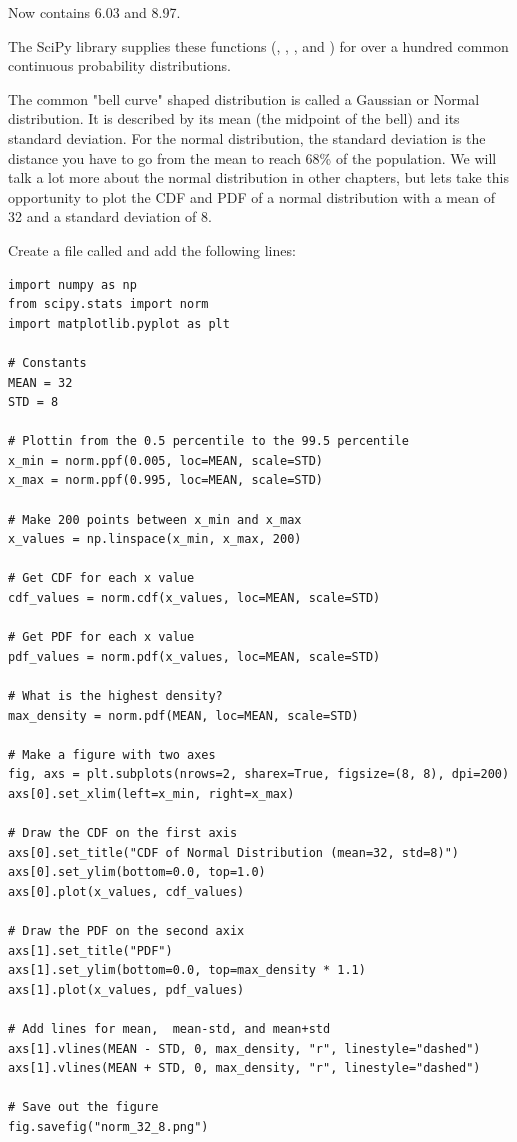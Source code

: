 Now  contains 6.03 and 8.97.

The SciPy library supplies these functions (, ,  , and ) for over a hundred 
common continuous probability distributions.   

The common "bell curve" shaped distribution is called a Gaussian  or Normal distribution.  It is described by its mean (the midpoint of the bell) and its standard deviation.   For the normal distribution,  the standard deviation is the distance you have to go from the mean to reach 68\% of the population. 
We will talk a lot more about the normal distribution in other chapters,  but lets take this opportunity to plot the CDF and PDF of a normal distribution with a mean of 32 and a standard deviation of 8.

Create a file called  and add the following lines:

\begin{verbatim}
import numpy as np
from scipy.stats import norm
import matplotlib.pyplot as plt

# Constants
MEAN = 32
STD = 8

# Plottin from the 0.5 percentile to the 99.5 percentile
x_min = norm.ppf(0.005, loc=MEAN, scale=STD)
x_max = norm.ppf(0.995, loc=MEAN, scale=STD)

# Make 200 points between x_min and x_max
x_values = np.linspace(x_min, x_max, 200)

# Get CDF for each x value
cdf_values = norm.cdf(x_values, loc=MEAN, scale=STD)

# Get PDF for each x value
pdf_values = norm.pdf(x_values, loc=MEAN, scale=STD)

# What is the highest density?
max_density = norm.pdf(MEAN, loc=MEAN, scale=STD)

# Make a figure with two axes
fig, axs = plt.subplots(nrows=2, sharex=True, figsize=(8, 8), dpi=200)
axs[0].set_xlim(left=x_min, right=x_max)

# Draw the CDF on the first axis
axs[0].set_title("CDF of Normal Distribution (mean=32, std=8)")
axs[0].set_ylim(bottom=0.0, top=1.0)
axs[0].plot(x_values, cdf_values)

# Draw the PDF on the second axix
axs[1].set_title("PDF")
axs[1].set_ylim(bottom=0.0, top=max_density * 1.1)
axs[1].plot(x_values, pdf_values)

# Add lines for mean,  mean-std, and mean+std
axs[1].vlines(MEAN - STD, 0, max_density, "r", linestyle="dashed")
axs[1].vlines(MEAN + STD, 0, max_density, "r", linestyle="dashed")

# Save out the figure
fig.savefig("norm_32_8.png")
\end{verbatim}

